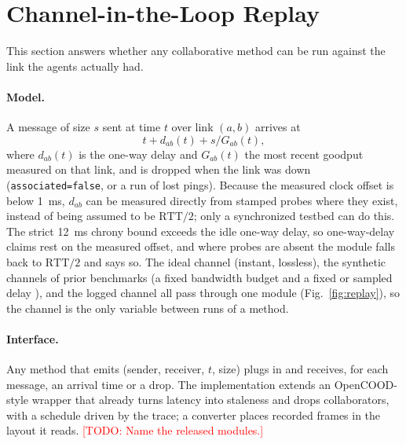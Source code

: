 \documentclass[journal]{IEEEtran}
\newcommand{\todo}[1]{\textcolor{red}{[TODO: #1]}}
\begin{document}


\section{Channel-in-the-Loop Replay}
\label{sec:replay}
This section answers whether any collaborative method can be run
against the link the agents actually had.

\paragraph{Model.} A message of size $s$ sent at time $t$ over link
$(a,b)$ arrives at
\begin{equation}
  t + d_{ab}(t) + s / G_{ab}(t),
  \label{eq:replay}
\end{equation}
where $d_{ab}(t)$ is the one-way delay and $G_{ab}(t)$ the most recent
goodput measured on that link, and is dropped when the link was down
(\texttt{associated=false}, or a run of lost pings). Because the
measured clock offset is below \SI{1}{\milli\second}, $d_{ab}$ can be
measured directly from stamped probes where they exist, instead of
being assumed to be $\mathrm{RTT}/2$; only a synchronized testbed can
do this. The strict \SI{12}{\milli\second} chrony bound exceeds the
idle one-way delay, so one-way-delay claims rest on the measured
offset, and where probes are absent the module falls back to
$\mathrm{RTT}/2$ and says so. The ideal channel (instant, lossless), the synthetic channels
of prior benchmarks (a fixed bandwidth budget and a fixed or sampled
delay \cite{where2comm,v2xvit,lei2022syncnet,wei2023cobevflow}), and
the logged channel all pass through one module
(Fig.~\ref{fig:replay}), so the channel is the only variable between
runs of a method.

\paragraph{Interface.} Any method that emits (sender, receiver, $t$,
size) plugs in and receives, for each message, an arrival time or a
drop. The implementation extends an OpenCOOD-style wrapper that already
turns latency into staleness and drops collaborators, with a schedule
driven by the trace; a converter places recorded frames in the layout
it reads. \todo{Name the released modules.}
\end{document}
